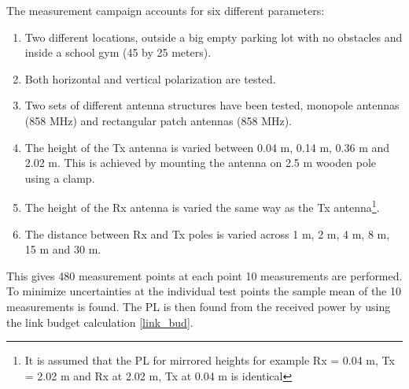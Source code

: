 The measurement campaign accounts for six different parameters: 
\begin{enumerate}
\item Two different locations, outside a big empty parking lot with no obstacles and inside a school gym (45 by 25 meters). 
\item Both horizontal and vertical polarization are tested. 
\item Two sets of different antenna structures have been tested, monopole antennas (858 MHz) and rectangular patch antennas (858 MHz). 
\item The height of the Tx antenna is varied between 0.04 m, 0.14 m, 0.36 m and 2.02 m. This is achieved by mounting the antenna on 2.5 m wooden pole using a clamp.
\item The height of the Rx antenna is varied the same way as the Tx antenna\footnote{It is assumed that the PL for mirrored heights for example Rx = 0.04 m, Tx = 2.02 m and Rx at 2.02 m, Tx at 0.04 m is identical}.
\item The distance between Rx and Tx poles is varied across 1 m, 2 m, 4 m, 8 m, 15 m and 30 m.
\end{enumerate}
This gives 480 measurement points at each point 10 measurements are performed. To minimize uncertainties at the individual test points the sample mean of the 10 measurements is found. The PL is then found from the received power by using the link budget calculation \eqref{link_bud}. %











